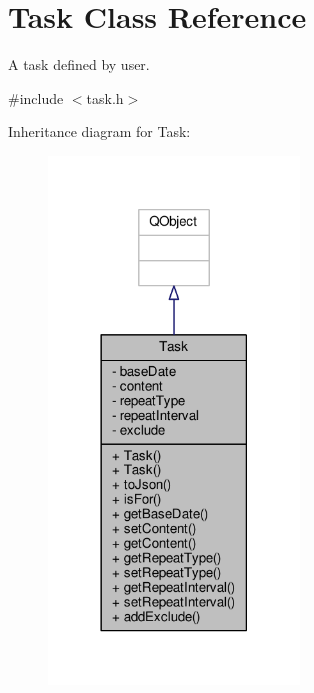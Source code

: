 \hypertarget{classTask}{}\section{Task Class Reference}
\label{classTask}


A task defined by user.  




{\ttfamily \#include $<$task.\+h$>$}



Inheritance diagram for Task\+:
\nopagebreak
\begin{figure}[H]
\begin{center}
\leavevmode
\includegraphics[width=189pt]{classTask__inherit__graph}
\end{center}
\end{figure}


